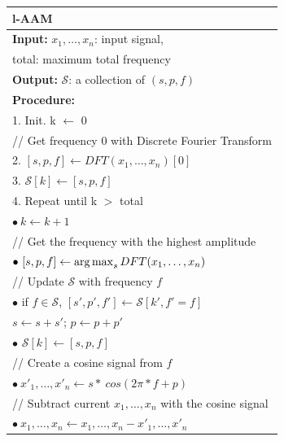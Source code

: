 \begin{figure}[t!]
	\begin{center}
		\begin{tabular*}{0.5\textwidth}{l @{\extracolsep{\fill}}}
			\hline
			\textbf{l-AAM} \textrm{\cite{jovan_iros16}} \\
			\hline
			\textbf{Input:} $x_1, \ldots, x_n$: input signal, \\
			\hspace{0.3cm} total: maximum total frequency \\
			\textbf{Output:} $\mathcal S$: a collection of $(s, p, f)$ \\
			\textbf{Procedure:}\\
			\hspace{0.3cm} 1. Init. k $\leftarrow$ 0 \\
			\hspace{0.3cm} // Get frequency $0$ with Discrete Fourier Transform \\
			\hspace{0.3cm} 2. $[s, p, f] \leftarrow DFT(x_1, \ldots, x_n)[0]$\\
			\hspace{0.3cm} 3. $\mathcal S[k] \leftarrow [s, p, f]$ \\
			\hspace{0.3cm} 4. Repeat until k $>$ total \\
			\hspace{0.7cm} $\bullet ~ k \leftarrow k + 1$ \\
			\hspace{0.7cm} // Get the frequency with the highest amplitude \\
			\hspace{0.7cm} $\bullet ~ [s, p, f] \leftarrow \operatorname*{arg\,max}_s DFT(x_1, \ldots, x_n)$ \\
			\hspace{0.7cm} // Update $\mathcal S$ with frequency $f$ \\
			\hspace{0.7cm} $\bullet$ if $f \in \mathcal S$, $[s', p', f'] \leftarrow \mathcal S[k', f'=f]$ \\
			\hspace{2.5cm} $s \leftarrow s + s'$; $p \leftarrow p + p'$ \\ 
			\hspace{0.7cm} $\bullet$ $\mathcal S[k] \leftarrow [s, p, f]$ \\
			\hspace{0.7cm} // Create a cosine signal from $f$ \\
			\hspace{0.7cm} $\bullet ~ x'_1, \ldots, x'_n \leftarrow s * ~ cos(2 \pi * f + p)$ \\
			\hspace{0.7cm} // Subtract current $x_1, \ldots, x_n$ with the cosine signal \\
			\hspace{0.7cm} $\bullet ~ x_1, \ldots, x_n \leftarrow x_1, \ldots, x_n - x'_1, \ldots, x'_n$ \\
			\hline
		\end{tabular*}	
	\end{center}
	\vspace{-10pt}
\end{figure}
